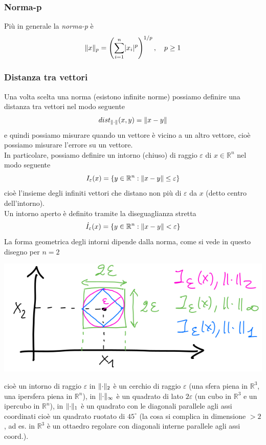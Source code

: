 \documentclass[12pt,a4paper]{article}
\DeclarePairedDelimiter{\abs}{\lvert}{\rvert}
\DeclarePairedDelimiter{\norma}{\lVert}{\rVert}
\begin{document}
\subsubsection{Norma-p}
Più in generale la \textit{norma-p} è
\[
\norma{x}_p = \left(\sum_{i=1}^n \abs{x_i}^p\right)^{1/p}, \quad p \ge 1
\]

\subsubsection{Distanza tra vettori}
Una volta scelta una norma (esistono infinite norme) possiamo definire una distanza tra vettori nel modo seguente
\[
dist_{\norma{\cdot}} (x,y) = \norma{x-y}
\]
e quindi possiamo misurare quando un vettore è vicino a un altro vettore, cioè possiamo misurare l'errore su un vettore.\\
In particolare, possiamo definire un intorno (chiuso) di raggio $\varepsilon$ di $x \in \mathbb{R}^n$ nel modo seguente
\begin{equation*}
    I_\varepsilon(x)=\left\{ y \in \mathbb{R}^n : \norma{x-y} \leq \varepsilon \right\}
\end{equation*}
cioè l'insieme degli infiniti vettori che distano non più di $\varepsilon$ da $x$ (detto centro dell'intorno). \\
Un intorno aperto è definito tramite la diseguaglianza stretta 
\begin{equation*}
    \Dot{I}_\varepsilon (x) = \left\{ y \in \mathbb{R}^n : \norma{x-y}<\varepsilon \right\}
\end{equation*}
La forma geometrica degli intorni dipende dalla norma, come si vede in questo disegno per $n=2$
\begin{center}
    \includegraphics[scale=0.5]{pag14.png}    
\end{center}
cioè un intorno di raggio $\varepsilon$ in $\norma{\cdot}_2$ è un cerchio di raggio $\varepsilon$ (una sfera piena in $\mathbb{R}^3$, una ipersfera piena in $\mathbb{R}^n$), in $\norma{\cdot}_\infty$ è un quadrato di lato $2\varepsilon$ (un cubo in $\mathbb{R}^3$ e un ipercubo in $\mathbb{R}^n$), in $\norma{\cdot}_1$ è un quadrato con le diagonali parallele agli assi coordinati cioè un quadrato ruotato di $45^\circ$ (la cosa si complica in dimensione $>2$, ad es. in $\mathbb{R}^3$ è un ottaedro regolare con diagonali interne parallele agli assi coord.). \\
\end{document}
